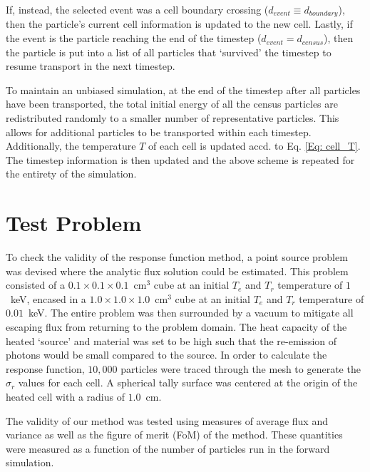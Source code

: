 \documentclass[]{article}
\begin{document}
  		 If, instead, the selected event was a cell boundary crossing ($d_{event} \equiv d_{boundary}$), then the particle's current cell information is updated to the new cell. Lastly, if the event is the particle reaching the end of the timestep ($d_{event} = d_{census}$), then the particle is put into a list of all particles that `survived' the timestep to resume transport in the next timestep. 
  		
  		To maintain an unbiased simulation, at the end of the timestep after all particles have been transported, the total initial energy of all the census particles are redistributed randomly to a smaller number of representative particles. This allows for additional particles to be transported within each timestep. Additionally, the temperature $T$ of each cell is updated accd. to Eq. \ref{Eq: cell_T}. The timestep information is then updated and the above scheme is repeated for the entirety of the simulation. 

\section{Test Problem}
	To check the validity of the response function method, a point source problem was devised where the analytic flux solution could be estimated. This problem consisted of a $0.1 \times 0.1 \times 0.1$~cm$^3$ cube at an initial $T_{e}$ and $T_{r}$ temperature of $1$~keV, encased in a $1.0 \times 1.0 \times 1.0$~cm$^3$ cube at an initial $T_{e}$ and $T_{r}$ temperature of $0.01$~keV. The entire problem was then surrounded by a vacuum to mitigate all escaping flux from returning to the problem domain. The heat capacity of the heated `source' and material was set to be high such that the re-emission of photons would be small compared to the source. In order to calculate the response function, $10,000$ particles were traced through the mesh to generate the $\sigma_{r}$ values for each cell. A spherical tally surface was centered at the origin of the heated cell with a radius of $1.0$~cm. 
	
	The validity of our method was tested using measures of average flux and variance as well as the figure of merit (FoM) of the method. These quantities were measured as a function of the number of particles run in the forward simulation. 
	
\end{document}
